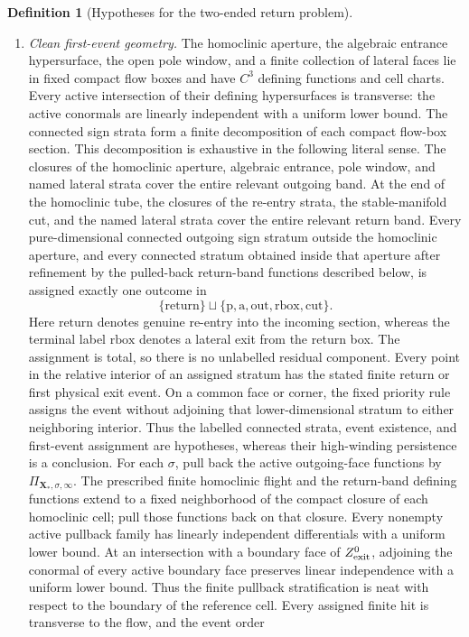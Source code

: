 \documentclass[11pt]{amsart}
\numberwithin{equation}{section}
\theoremstyle{definition}
\newtheorem{definition}[theorem]{Definition}
\theoremstyle{remark}
\newcommand{\rbox}{\mathrm{rbox}}
\begin{document}
\begin{definition}[Hypotheses for the two-ended return problem]
\begin{enumerate}
\item \emph{Clean first-event geometry.}
The homoclinic aperture, the algebraic entrance hypersurface, the open
pole window, and a finite collection of lateral faces lie in fixed compact
flow boxes and have $C^3$ defining functions and cell charts.  Every active
intersection of their defining hypersurfaces is transverse: the active
conormals are linearly independent with a uniform lower bound.  The
connected sign strata form a finite decomposition of each compact
flow-box section.  This decomposition is exhaustive in the following
literal sense.  The closures of the homoclinic aperture, algebraic
entrance, pole window, and named lateral strata cover the entire relevant
outgoing band.  At the end of the homoclinic tube, the closures of the
re-entry strata, the stable-manifold cut, and the named lateral strata
cover the entire relevant return band.  Every pure-dimensional connected
outgoing sign stratum outside the homoclinic aperture, and every connected
stratum obtained inside that aperture after refinement by the pulled-back
return-band functions described below, is assigned exactly one outcome in
\[
 \{\mathrm{return}\}\sqcup
 \{\mathrm p,\mathrm a,\mathrm{out},\rbox,\mathrm{cut}\}.
\]
Here $\mathrm{return}$ denotes genuine re-entry into the incoming section,
whereas the terminal label $\rbox$ denotes a lateral exit from the
return box.  The assignment is total, so there is no unlabelled residual
component.  Every point in the relative interior of an assigned stratum
has the stated finite return or first physical exit event.  On a common
face or corner, the fixed
priority rule assigns the event without adjoining that lower-dimensional
stratum to either neighboring interior.  Thus the labelled connected
strata, event
existence, and first-event assignment are hypotheses, whereas their
high-winding persistence is a conclusion.  For each $\sigma$, pull back the active outgoing-face
functions by $\Pi_{\mathbf X_*,\sigma,\infty}$.  The prescribed finite
homoclinic flight and the return-band defining functions extend to a fixed
neighborhood of the compact closure of each homoclinic cell; pull those
functions back on that closure.  Every nonempty active pullback family has linearly
independent differentials with a uniform lower bound.  At an intersection
with a boundary face of $Z_{\rm exit}^0$, adjoining the conormal of every
active boundary face preserves linear independence with a uniform lower
bound.  Thus the finite pullback stratification is neat with respect to the
boundary of the reference cell.
Every assigned finite hit is transverse to the flow, and the event order

\end{enumerate}
\end{definition}
\end{document}
